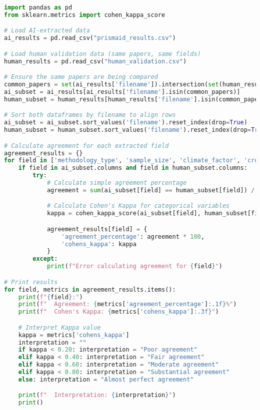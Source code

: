 \begin{commandbox}
\begin{lstlisting}[language=Python]
import pandas as pd
from sklearn.metrics import cohen_kappa_score

# Load AI-extracted data
ai_results = pd.read_csv("prismaid_results.csv")

# Load human validation data (same papers, same fields)
human_results = pd.read_csv("human_validation.csv")

# Ensure the same papers are being compared
common_papers = set(ai_results['filename']).intersection(set(human_results['filename']))
ai_subset = ai_results[ai_results['filename'].isin(common_papers)]
human_subset = human_results[human_results['filename'].isin(common_papers)]

# Sort both dataframes by filename to align rows
ai_subset = ai_subset.sort_values('filename').reset_index(drop=True)
human_subset = human_subset.sort_values('filename').reset_index(drop=True)

# Calculate agreement for each extracted field
agreement_results = {}
for field in ['methodology_type', 'sample_size', 'climate_factor', 'crop_type']:
    if field in ai_subset.columns and field in human_subset.columns:
        try:
            # Calculate simple agreement percentage
            agreement = sum(ai_subset[field] == human_subset[field]) / len(ai_subset)

            # Calculate Cohen's Kappa for categorical variables
            kappa = cohen_kappa_score(ai_subset[field], human_subset[field])

            agreement_results[field] = {
                'agreement_percentage': agreement * 100,
                'cohens_kappa': kappa
            }
        except:
            print(f"Error calculating agreement for {field}")

# Print results
for field, metrics in agreement_results.items():
    print(f"{field}:")
    print(f"  Agreement: {metrics['agreement_percentage']:.1f}%")
    print(f"  Cohen's Kappa: {metrics['cohens_kappa']:.3f}")

    # Interpret Kappa value
    kappa = metrics['cohens_kappa']
    interpretation = ""
    if kappa < 0.20: interpretation = "Poor agreement"
    elif kappa < 0.40: interpretation = "Fair agreement"
    elif kappa < 0.60: interpretation = "Moderate agreement"
    elif kappa < 0.80: interpretation = "Substantial agreement"
    else: interpretation = "Almost perfect agreement"

    print(f"  Interpretation: {interpretation}")
    print()
\end{lstlisting}
\end{commandbox}

